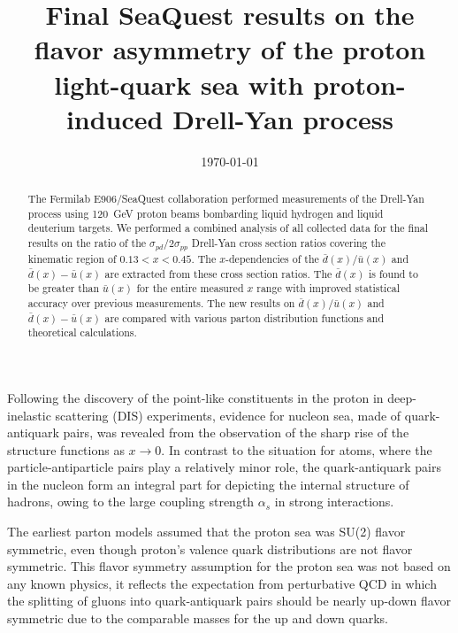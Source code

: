 \documentclass[reprint,aps,unsortedaddress,superscriptaddress,prl,floatfix,showpacs,linenumbers]{revtex4-2}
\begin{document}
\title{Final SeaQuest results on the flavor asymmetry of the proton light-quark sea with proton-induced Drell-Yan process}


\date{\today}

\begin{abstract}
	The Fermilab E906/SeaQuest collaboration performed measurements of the Drell-Yan process using
	\SI{120}{\GeV} proton beams bombarding liquid hydrogen and liquid deuterium targets.
	We performed a combined analysis of all collected data for the final results on the ratio of the $\sigma_{pd}/2\sigma_{pp}$ Drell-Yan cross
	section ratios covering the kinematic region of $0.13 < x < 0.45$.
	The $x$-dependencies of the $\bar{d}\left(x\right) / \bar{u}\left(x\right)$ and $\bar{d}\left(x\right) - \bar{u}\left(x\right)$
	are extracted from these cross section ratios.
	The $\bar{d}\left(x\right)$ is found to be greater than $\bar{u}\left(x\right)$ for the entire measured $x$
	range with improved statistical accuracy over previous measurements.
	The new results on $\bar{d}\left(x\right) / \bar{u}\left(x\right)$ and $\bar{d}\left(x\right) - \bar{u}\left(x\right)$
	are compared with various parton distribution functions and theoretical calculations.
\end{abstract}


\maketitle


Following the discovery of the point-like constituents in the proton in
deep-inelastic scattering (DIS) experiments, evidence for nucleon sea,
made of quark-antiquark pairs,
was revealed from the observation of the sharp rise of the structure
functions as $x \to 0$. In contrast to the situation for atoms, where
the particle-antiparticle pairs play a relatively minor role, the
quark-antiquark pairs in the nucleon form an integral part for
depicting the internal structure of hadrons, owing to the large
coupling strength $\alpha_s$ in strong interactions.

The earliest parton models assumed that the proton sea was SU(2)
flavor symmetric, even though proton's valence quark
distributions are not flavor symmetric. This flavor symmetry assumption
for the proton sea was not based on any known physics, it reflects the
expectation from perturbative QCD in which the splitting of gluons
into quark-antiquark pairs should be nearly up-down flavor symmetric
due to the comparable masses for the up and down quarks.
\end{document}

